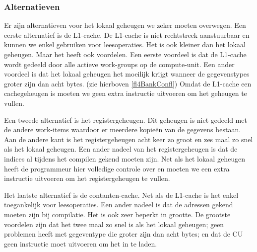 \subsubsection{Alternatieven}
Er zijn alternatieven voor het lokaal geheugen we zeker moeten overwegen. Een eerste alternatief is de L1-cache. De L1-cache is niet rechtstreek aanstuurbaar en kunnen we enkel gebruiken voor leesoperaties. Het is ook kleiner dan het lokaal geheugen. Maar het heeft ook voordelen. Een eerste voordeel is dat de L1-cache wordt gedeeld door alle actieve work-groups op de compute-unit. Een ander voordeel is dat het lokaal geheugen het moeilijk krijgt wanneer de gegevenstypes groter zijn dan acht bytes. (zie hierboven \ref{fl4BankConfl}) Omdat de L1-cache een cachegeheugen is moeten we geen extra instructie uitvoeren om het geheugen te vullen.

Een tweede alternatief is het registergeheugen. Dit geheugen is niet gedeeld met de andere work-items waardoor er meerdere kopie\"en van de gegevens bestaan. Aan de andere kant is het registergeheugen acht keer zo groot en zes maal zo snel als het lokaal geheugen. Een ander nadeel van het registergeheugen is dat de indices al tijdens het compilen gekend moeten zijn. Net als het lokaal geheugen heeft de programmeur hier volledige controle over en moeten we een extra instructie uitvoeren om het registergeheugen te vullen.

Het laatste alternatief is de contanten-cache. Net als de L1-cache is het enkel toegankelijk voor leesoperaties. Een ander nadeel is dat de adressen gekend moeten zijn bij compilatie. Het is ook zeer beperkt in grootte. De grootste voordelen zijn dat het twee maal zo snel is als het lokaal geheugen; geen problemen heeft met gegeventype die groter zijn dan acht bytes; en dat de CU geen instructie moet uitvoeren om het in te laden.